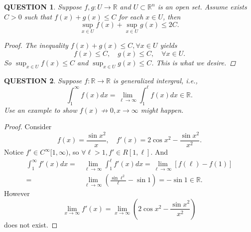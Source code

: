 \documentclass[12pt]{article}
\renewcommand{\(}{\left(}%
\renewcommand{\)}{\right)}%
\renewcommand{\[}{\left[}%
\renewcommand{\]}{\right]}%
\renewcommand{\r}{\mathbb{R}}
\newcommand{\li}{\lim\limits_}
\newtheorem{question}{QUESTION}[section]}
\newtheorem{proof}{Proof.}}
\begin{document}
  \begin{question}
   Suppose $f,g:U\to\r$ and $U\subset\r^n$ is an open set. Assume exists $C>0$ such that $f(x)+g(x)\leq C$ for each $x\in U$, then
   \begin{equation*}
    \sup_{x\in U}f(x)+\sup_{x\in U}g(x)\leq 2C.
   \end{equation*}
   \begin{proof}
    The inequality $f(x)+g(x)\leq C,\forall x\in U$ yields
    \begin{equation*}
     f(x)\leq C,\quad g(x)\leq C,\quad\forall x\in U.
    \end{equation*}
    So $\sup_{x\in U}f(x)\leq C$ and $\sup_{x\in U}g(x)\leq C$. This is what we desire.
   \end{proof}
  \end{question}
  \begin{question}
   Suppose $f:\r\to\r$ is generalized intergral, i.e.,
   \begin{equation*}
    \int_1^\infty f(x)dx=\li{\ell\to\infty}\int_1^\ell f(x)dx\in\r.
   \end{equation*}
    Use an example to show $f(x)\not\to0,x\to\infty$ might happen.
  \end{question}
  \begin{proof}
   Consider
   \begin{equation*}
    f(x)=\frac{\sin x^2}{x},\quad f'(x)=2\cos x^2- \frac{\sin x^2}{x^2}.
   \end{equation*}
   Notice $f'\in C^\infty[1,\infty)$, so $\forall\ell> 1, f'\in R[1,\ell]$. And
   \begin{equation*}
    \begin{split}
     \int_1^\infty f'(x)dx=&\li{\ell\to\infty}\int_1^\ell f'(x)dx=\li{\ell\to\infty}\[f(\ell)-f(1) \]\\
     =&\li{\ell\to\infty}\(\frac{\sin\ell^2}{\ell}-\sin 1 \)=-\sin 1\in\r.
    \end{split}
   \end{equation*}
   However
   \begin{equation*}
    \li{x\to\infty}f'(x)=\li{x\to\infty}\(2\cos x^2- \frac{\sin x^2}{x^2}\)
   \end{equation*}
   does not exist.
  \end{proof}
\end{document}
